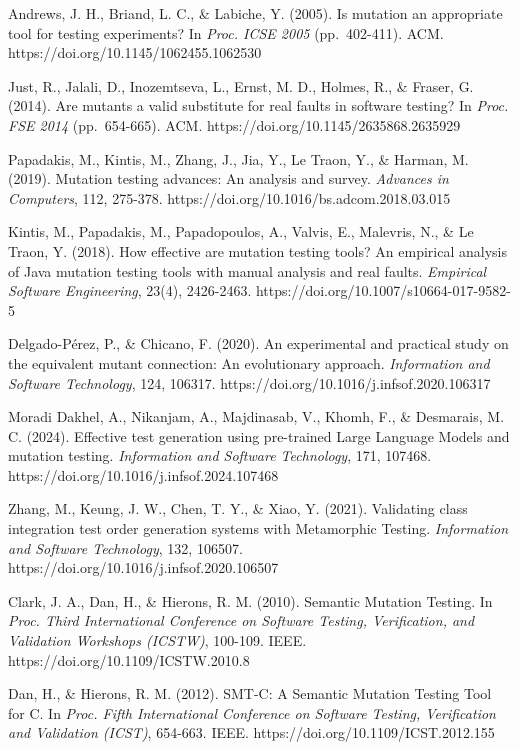 \documentclass[review,12pt,authoryear]{elsarticle}
\begin{document}
Andrews, J. H., Briand, L. C., \& Labiche, Y. (2005). Is mutation an
appropriate tool for testing experiments? In \emph{Proc. ICSE 2005}
(pp.~402-411). ACM. https://doi.org/10.1145/1062455.1062530

Just, R., Jalali, D., Inozemtseva, L., Ernst, M. D., Holmes, R., \&
Fraser, G. (2014). Are mutants a valid substitute for real faults in
software testing? In \emph{Proc. FSE 2014} (pp.~654-665). ACM.
https://doi.org/10.1145/2635868.2635929

Papadakis, M., Kintis, M., Zhang, J., Jia, Y., Le Traon, Y., \& Harman,
M. (2019). Mutation testing advances: An analysis and survey.
\emph{Advances in Computers}, 112, 275-378.
https://doi.org/10.1016/bs.adcom.2018.03.015

Kintis, M., Papadakis, M., Papadopoulos, A., Valvis, E., Malevris, N.,
\& Le Traon, Y. (2018). How effective are mutation testing tools? An
empirical analysis of Java mutation testing tools with manual analysis
and real faults. \emph{Empirical Software Engineering}, 23(4),
2426-2463. https://doi.org/10.1007/s10664-017-9582-5

Delgado-Pérez, P., \& Chicano, F. (2020). An experimental and practical
study on the equivalent mutant connection: An evolutionary approach.
\emph{Information and Software Technology}, 124, 106317.
https://doi.org/10.1016/j.infsof.2020.106317

Moradi Dakhel, A., Nikanjam, A., Majdinasab, V., Khomh, F., \&
Desmarais, M. C. (2024). Effective test generation using pre-trained
Large Language Models and mutation testing. \emph{Information and
Software Technology}, 171, 107468.
https://doi.org/10.1016/j.infsof.2024.107468

Zhang, M., Keung, J. W., Chen, T. Y., \& Xiao, Y. (2021). Validating
class integration test order generation systems with Metamorphic
Testing. \emph{Information and Software Technology}, 132, 106507.
https://doi.org/10.1016/j.infsof.2020.106507

Clark, J. A., Dan, H., \& Hierons, R. M. (2010). Semantic Mutation
Testing. In \emph{Proc. Third International Conference on Software
Testing, Verification, and Validation Workshops (ICSTW)}, 100-109. IEEE.
https://doi.org/10.1109/ICSTW.2010.8

Dan, H., \& Hierons, R. M. (2012). SMT-C: A Semantic Mutation Testing
Tool for C. In \emph{Proc. Fifth International Conference on Software
Testing, Verification and Validation (ICST)}, 654-663. IEEE.
https://doi.org/10.1109/ICST.2012.155
\end{document}
